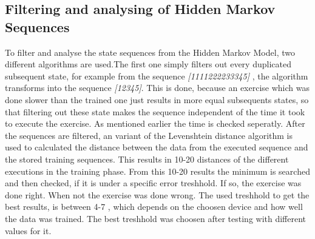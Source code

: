 \subsection{Filtering and analysing of Hidden Markov Sequences}

To filter and analyse the state sequences from the Hidden Markov Model, two different algorithms are used.The first one simply filters out every duplicated subsequent state, for example from the sequence \textit{\small[1111222233345]} , the algorithm transforms into the sequence \textit{\small[12345]}. This is done, because an exercise which was done slower than the trained one just results in more equal subsequents states, so that filtering out these state makes the sequence independent of the time it took to execute the exercise. As mentioned earlier the time is checked seperatly. %
\newline
\newline
After the sequences are filtered, an variant of the Levenshtein distance algorithm is used to calculated the distance between the data from the executed sequence and the stored training sequences. This results in 10-20 distances of the different executions in the training phase. From this 10-20 results the minimum is searched and then checked, if it is under a specific error treshhold. If so, the exercise was done right. When not the exercise was done wrong. The used treshhold to get the best results, is between 4-7 , which depends on the choosen device and how well the data was trained. The best treshhold was choosen after testing with different values for it.
